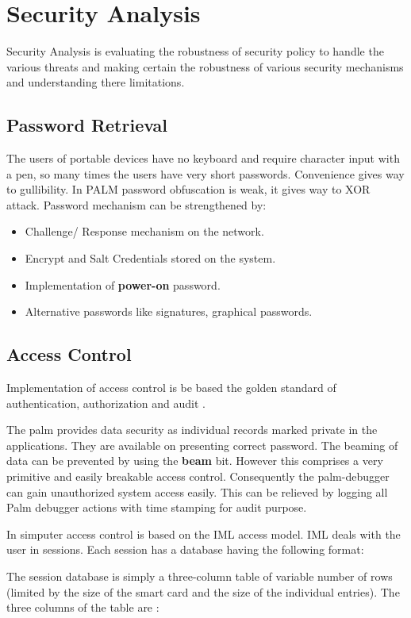\documentclass[11pt]{article}
\begin{document}
\section{Security Analysis}
Security Analysis is evaluating the robustness of security policy to handle the various threats and  making certain the robustness of various security mechanisms and understanding there limitations.
\subsection{Password Retrieval}
The users of portable devices have no keyboard and require character input with a pen, so many times the users have very short passwords. Convenience gives way to gullibility. In PALM password obfuscation is weak, it gives way to XOR attack\cite{mudge01}. Password mechanism can be strengthened by: 
\begin{itemize}\addtolength{\itemsep}{-0.5\baselineskip}
\item Challenge/ Response mechanism on the network.
\item Encrypt and Salt Credentials stored on the system.
\item Implementation of {\bf power-on} password.
\item Alternative passwords like signatures, graphical passwords.
\end {itemize}

\subsection{Access Control}
Implementation of access control is be based the golden standard of authentication, authorization and audit \cite{lamp}.

The palm provides data security as individual records marked private in the applications. They are available on presenting correct password. The beaming of data can be prevented by using the {\bf beam} bit. However this comprises a very primitive and easily breakable access control. Consequently the palm-debugger can gain unauthorized system access easily. This can be relieved by logging all Palm debugger actions with time stamping for audit purpose.

In simputer access control is based on the IML access model. IML deals with the user in sessions. Each session has a database having the following format:

The session database is simply a three-column table of variable number of rows (limited by the size of the smart card and the size of the individual entries). The three columns of the table are \cite{simpIML}: 
\end{document}
